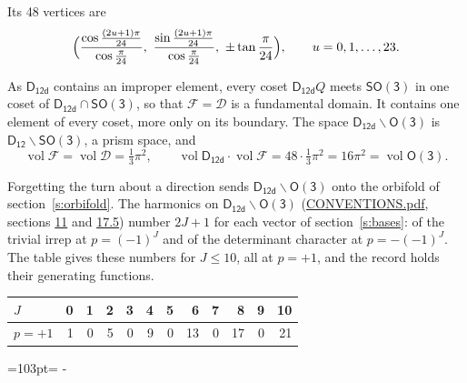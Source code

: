 \documentclass[10pt,a4paper]{article}
\newcommand{\needspace}[1]{\par\penalty-100\begingroup\dimen0=#1\relax\dimen2=\pagegoal
  \advance\dimen2-\pagetotal\ifdim\dimen0>\dimen2\relax\ifdim\dimen2>0pt\vfil\break\fi\fi
  \endgroup}
\numberwithin{equation}{section}
\newcommand{\grp}[1]{\mathsf{#1}}
\newcommand{\vol}{\operatorname{vol}}
\newcommand{\fcell}{\mathcal{D}}
\newcommand{\fdomain}{\mathcal{F}}
\begin{document}
\leavevmode\label{n:local.vertex.u}Its 48 vertices are
\begin{equation}\label{e:prism}\Bigl(\frac{\cos\frac{(2u+1)\pi}{24}}{\cos\frac{\pi}{24}},\ \frac{\sin\frac{(2u+1)\pi}{24}}{\cos\frac{\pi}{24}},\ \pm\tan\frac{\pi}{24}\Bigr),\qquad u = 0, 1, \dots, 23.\end{equation}

\leavevmode\label{n:set.fundamental}As $\grp{D_{12d}}$ contains an improper element, every coset $\grp{D_{12d}}Q$ meets \href{SO3.pdf}{$\grp{SO(3)}$} in one coset of $\grp{D_{12d}} \cap \grp{SO(3)}$, so that $\fdomain = \fcell$ is a fundamental domain. It contains one element of every coset, more only on its boundary.
The space $\grp{D_{12d}}\backslash\grp{O(3)}$ is $\grp{D_{12}}\backslash\grp{SO(3)}$, a prism space, and
\begin{equation}\label{e:volume}\vol\fdomain = \vol\fcell = \tfrac{1}{3}\pi^2,\qquad \vol\grp{D_{12d}}\cdot\vol\fdomain = 48\cdot \tfrac{1}{3}\pi^2 = 16\pi^2 = \vol\grp{O(3)}.\end{equation}

Forgetting the turn about a direction sends $\grp{D_{12d}}\backslash\grp{O(3)}$ onto the orbifold of section~\ref{s:orbifold}.
The harmonics on $\grp{D_{12d}}\backslash\grp{O(3)}$ (\href{../../CONVENTIONS.pdf}{CONVENTIONS.pdf}, sections \href{../../CONVENTIONS.pdf\#conv.11}{11} and \href{../../CONVENTIONS.pdf\#conv.17.5}{17.5}) number $2J + 1$ for each vector of section~\ref{s:bases}: of the trivial irrep at $p = (-1)^J$ and of the determinant character at $p = -(-1)^J$. The table gives these numbers for $J \le 10$, all at $p = +1$, and the record holds their generating functions.
{\small\setlength{\tabcolsep}{4pt}\begin{longtable}{@{}lrrrrrrrrrrr@{}}\toprule
$J$ & 0 & 1 & 2 & 3 & 4 & 5 & 6 & 7 & 8 & 9 & 10\\\midrule\endhead
\bottomrule\endfoot\endlastfoot
$p = +1$ & 1 & 0 & 5 & 0 & 9 & 0 & 13 & 0 & 17 & 0 & 21\\
\bottomrule\end{longtable}}
\needspace{103pt}
\end{document}
